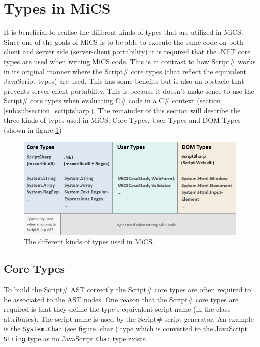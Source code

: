 \section{Types in MiCS} %
\label{sec:types_in_mics}
	It is beneficial to realise the different kinds of types that are utilized in MiCS. Since one of the goals of MiCS is to be able to execute the same code on both client and server side (server-client portability) it is required that the .NET core types are used when writing MiCS code. This is in contrast to how Script\# works in its original manner where the Script\# core types (that reflect the equivalent JavaScript types) are used. This has some benefits but is also an obstacle that prevents server client portability. This is because it doesn't make sence to use the Script\# core types when evaluating C\# code in a C\# context (section \ref{sub:subsection_scriptsharp}). The remainder of this section will describe the three kinds of types used in MiCS; Core Types, User Types and DOM Types (shown in figure \ref{typesOverview})
	
	\begin{figure}
		\begin{center}
			\centerline{\includegraphics[width=16cm]{resources/images/TypesOverview.png}}
		\end{center}
		\caption{The different kinds of types used in MiCS.}
		\label{typesOverview}
	\end{figure}

	\subsection{Core Types} %
	\label{sub:core_types}
		To build the Script\# AST correctly the Script\# core types are often required to be associated to the AST nodes. One reason that the Script\# core types are required is that they define the type's equivalent script name (in the class attributes). The script name is used by the Script\# script generator. An example is the \texttt{System.Char} (see figure \ref{char}) type which is converted to the JavaScript \texttt{String} type as no JavaScript \texttt{Char} type exists.

